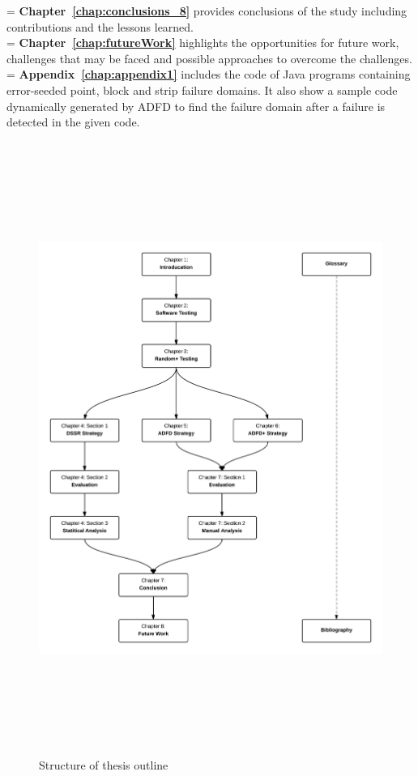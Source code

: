\hangindent=\parindent
{}
\noindent
\textbf{Chapter~\ref{chap:conclusions_8}} provides conclusions of the study including contributions and the lessons learned.\\

\hangindent=\parindent
{}
\noindent
\textbf{Chapter~\ref{chap:futureWork}} highlights the opportunities for future work, challenges that may be faced and possible approaches to overcome the challenges.\\


 \hangindent=\parindent
 \noindent
 \textbf{Appendix~\ref{chap:appendix1}} includes the code of Java programs containing error-seeded point, block and strip failure domains. It also show a sample code dynamically generated by ADFD to find the failure domain after a failure is detected in the given code.\\

\newpage
\begin{figure}[h]
	\centering
		\includegraphics[width=16cm, height=20cm ]{chapter1/thesisOutline2.png}
		\bigskip
		\caption{Structure of thesis outline}
	\label{fig:thesisOutline}
\end{figure}



